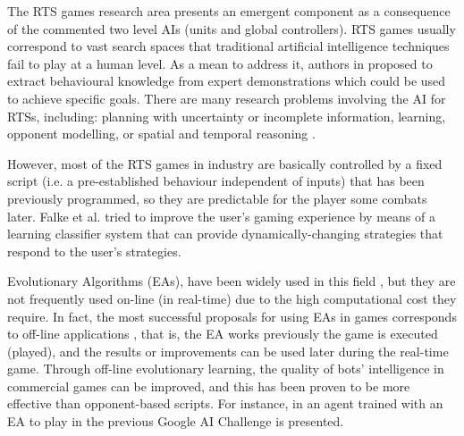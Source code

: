 \documentclass[runningheads]{llncs}
\begin{document}
The RTS games research area presents an emergent component \cite{emergence_in_games2008} as a consequence of the commented two level AIs (units and global controllers). RTS games usually correspond to vast search spaces that traditional artificial intelligence techniques fail to play at a human level. As a mean to address it, authors in \cite{ontanon2007} proposed to extract behavioural knowledge from expert demonstrations which could be used to achieve specific goals. 
There are many research problems involving the AI for RTSs, including: planning with uncertainty or incomplete information, learning, opponent modelling, or spatial and temporal reasoning \cite{AIRTS2004}. 

However, most of the RTS games in industry are basically controlled by a fixed script (i.e. a pre-established behaviour independent of inputs) that has been previously programmed, so they are predictable for the player some combats later. Falke et al. \cite{falke2003} tried to improve the user's gaming experience by means of a learning classifier system that can provide dynamically-changing strategies that respond to the user's strategies.  




Evolutionary Algorithms (EAs), have been widely used in this field \cite{Ponsen_EvLearn_RTS,Su-EAs_StrategySel09}, 
but they are not frequently used on-line (in real-time) due to the high computational cost they require. In fact, the most successful proposals for using EAs in games corresponds to off-line applications \cite{offline-evolutionary-learning}, that is, the EA works previously the game is executed (played), and the results or improvements can be used later during  the real-time game. Through off-line evolutionary learning, the quality of bots' intelligence in commercial games can be improved, and this has been proven to be more effective than opponent-based scripts.
For instance, in \cite{GENEBOTEVOSTAR12} an agent trained with an EA to play in the previous Google AI Challenge is presented. %
\end{document}
